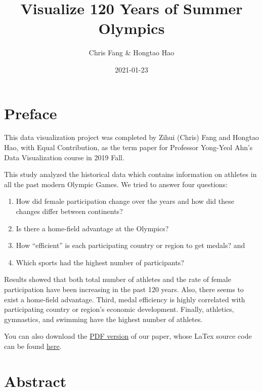 \documentclass[
]{article}
\title{Visualize 120 Years of Summer Olympics}
\author{Chris Fang \& Hongtao Hao}
\date{2021-01-23}
\begin{document}
\maketitle

{
\setcounter{tocdepth}{2}
\tableofcontents
}
\hypertarget{preface}{%
\section*{Preface}\label{preface}}

This data visualization project was completed by Zihui (Chris) Fang and Hongtao Hao, with Equal Contribution, as the term paper for Professor Yong-Yeol Ahn's Data Visualization course in 2019 Fall.

This study analyzed the historical data which contains information on athletes in all the past modern Olympic Games. We tried to answer four questions:

\begin{enumerate}
\def\labelenumi{\arabic{enumi}.}
\item
  How did female participation change over the years and how did these changes differ between continents?
\item
  Is there a home-field advantage at the Olympics?
\item
  How ``efficient'' is each participating country or region to get medals? and
\item
  Which sports had the highest number of participants?
\end{enumerate}

Results showed that both total number of athletes and the rate of female participation have been increasing in the past 120 years. Also, there seems to exist a home-field advantage. Third, medal efficiency is highly correlated with participating country or region's economic development. Finally, athletics, gymnastics, and swimming have the highest number of athletes.

You can also download the \href{https://raw.githubusercontent.com/hongtaoh/olymvis/master/static/tex-pdf/fang_hao_olymvis.pdf}{PDF version} of our paper, whose LaTex source code can be found \href{https://github.com/hongtaoh/olymvis/blob/master/static/tex-pdf/fang_hao_olymvis.tex}{here}.

\hypertarget{abstract}{%
\section*{Abstract}\label{abstract}}
\end{document}
